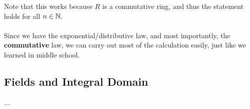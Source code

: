 Note that this works because $R$ is a commutative ring, and thus the statement holds for all $n\in \mathbb{N}$.\\
\\
 Since we have the exponential/distributive law, and most importantly, the \textbf{commutative} law, we can carry out most of the calculation easily, just like we learned in middle school.\\

\subsection{Fields and Integral Domain}
 ...